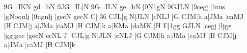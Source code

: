 \temps\notes\qqbbl9G{=I}KN\enotes
\motif gd{=b}N\relax
\barre\notes\LPED\qsoupir
{\tqbbH9JG{=I}L}|\Sfwu N\enotes
\temps\notes\qqbbl9G{=I}LN\enotes
\motif ge{=b}N\relax
\barre\notes\LPED{}|\itenl0N\itenu1g\Sfwu N\enotes
\temps\notes\qqbbl9GJLN\enotes
\zbarre\notes|\qqbbl9cegj\enotes
\temps\notes|lnus\enotes
\troistemps\changecontext\notes|\zw g\zw Noqnlj\enotes
\temps\notes|\qqbbH0ngnlj\enotes
\temps\notes|gecN\enotes
\zbarre\notes{}\relax{}gecN\enotes
\temps\notes\qu C\DEP\soupir\qsk|\qsk\hpause\enotes
%
\deuxtemps\pchangecontext{}36\notes\LPED\qsoupir
{}\Tqbbh CJL|\qsk\wh g\enotes
\temps\notes\cu N|\sk{}\Tqbbh JLN\enotes
\temps\notes|\Qqbbu cNLJ\enotes
\temps\Notes\sk\DEP|\cu G\dsoupir\enotes
%
\barre\notes\LPED\qsoupir\Tqbbh CJM|\qsk\wh h\enotes
\temps\notes\cu a|\sk{}\Tqbbu JMa\enotes
\temps\notes|\Qqbbu caMJ\enotes
\temps\Notes\sk\DEP|\cu H\dsoupir\enotes
%
\barre\notes\LPED\qsoupir\Tqbbh CJM|\qsk\wh j\enotes
\temps\notes\cu a|\sk{}\Tqbbu JMa\enotes
\temps\notes|\Qqbbu caMJ\enotes
\temps\Notes\sk\DEP|\cu H\dsoupir\enotes
%
\barre\notes\LPED\qsoupir\Tqbbh CJM|\qsk\wh k\enotes
\temps\notes\cu a|\sk{}\Tqbbu KMa\enotes
\temps\notes|\Qqbbu daMK\enotes
\temps\Notes\sk\DEP|\cu H\dsoupir\enotes
%
\barre\notes\LPED\qsoupir{}E|\qsk\itenu1g\wh g\enotes
\temps\notes\Qqbbu GJLN\enotes
\temps\notes|\Qqbbu cegj\enotes
\temps\notes|\Qqbbu ljge\enotes
%
\barre\notes|\pt g\zhl g\Qqbbu jgec\enotes
\temps\notes|\Qqbbu gecN\enotes
\temps\notes\Qqbbu ecNL\enotes
\temps\notes\cu J\DEP\dsoupir|\soupir\enotes
%
\barre\notes\LPED\qsoupir\Tqbbh CJL|\qsk\wh g\enotes
\temps\notes\cu N|\sk{}\Tqbbu JLN\enotes
\temps\notes|\Qqbbu cNLJ\enotes
\temps\Notes\sk\DEP|\cu G\dsoupir\enotes
%
\barre\notes\LPED\qsoupir\Tqbbh CJM|\qsk\wh h\enotes
\temps\notes\cu a|\sk{}\Tqbbu JMa\enotes
\temps\notes|\Qqbbu caMJ\enotes
\temps\Notes\sk\DEP|\cu H\dsoupir\enotes
%
\barre\notes\LPED\qsoupir\Tqbbh CJM|\qsk\wh j\enotes
\temps\notes\cu a|\sk{}\Tqbbu JMa\enotes
\temps\notes|\Qqbbu caMJ\enotes
\temps\Notes\sk\DEP|\cu H\dsoupir\enotes
%
\barre\notes\LPED\qsoupir\Tqbbh CJM|\qsk\wh k\enotes
